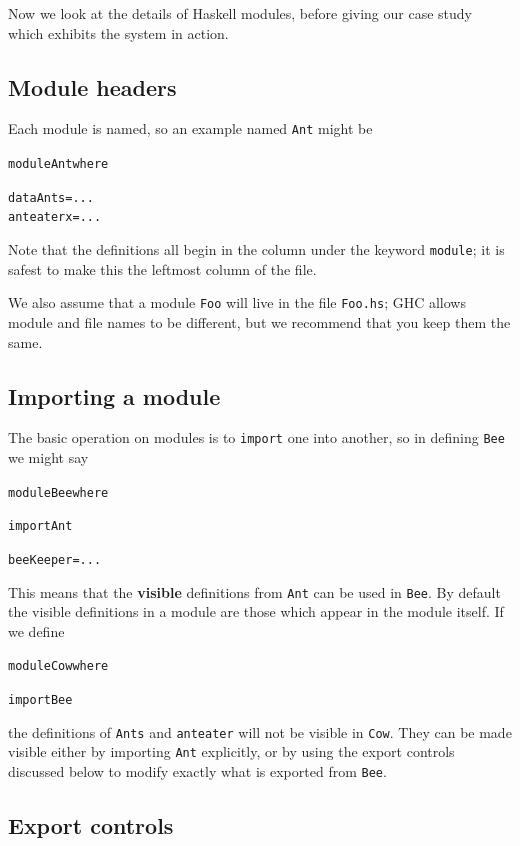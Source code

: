 Now we look at the details of Haskell modules, before giving our case study which
exhibits the system in action.

\subsection*{Module headers}

Each module is named, so an example named \texttt{Ant} might be
\begin{alltt}
module Ant where

data Ants  = ...
anteater x = ...
\end{alltt}
Note that the definitions all begin in the column under the keyword
\texttt{module}; it is safest to make this the leftmost column of the
file.


We also assume that a module \texttt{Foo} will live in the file \texttt{Foo.hs}; GHC allows module and file names to be different, but we recommend that you keep them the same. 

\subsection*{Importing a module}

The basic operation on modules is to \texttt{import} one into another, so in
defining \texttt{Bee} we might say
\begin{alltt}
module Bee where

import Ant

beeKeeper = ...
\end{alltt}
This means that the \textbf{visible} definitions from \texttt{Ant}
can be used in 
\texttt{Bee}. By default the visible definitions in
a module are those which appear in the module itself. If we define
\begin{alltt}
module Cow where

import Bee
\end{alltt}
the definitions of \texttt{Ants} and \texttt{anteater} will not be visible in 
\texttt{Cow}. They can be made visible either by importing \texttt{Ant} explicitly,
or by using the export controls
discussed below to modify exactly what is exported from \texttt{Bee}.


\subsection*{Export controls}


